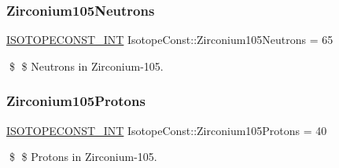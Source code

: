 \subsubsection{\texorpdfstring{Zirconium105\+Neutrons}{Zirconium105Neutrons}}
{\footnotesize\ttfamily \mbox{\hyperlink{group___isotope_const-_macros_ga5f18360b3e99483a35c32d789e62621c}{I\+S\+O\+T\+O\+P\+E\+C\+O\+N\+S\+T\+\_\+\+I\+NT}} Isotope\+Const\+::\+Zirconium105\+Neutrons = 65}

\$ \$ Neutrons in Zirconium-\/105. \mbox{\label{group___isotope_const-_zirconium-_zr105_gae532e434485d6dff9c8f589cf54dce54}} 
\subsubsection{\texorpdfstring{Zirconium105\+Protons}{Zirconium105Protons}}
{\footnotesize\ttfamily \mbox{\hyperlink{group___isotope_const-_macros_ga5f18360b3e99483a35c32d789e62621c}{I\+S\+O\+T\+O\+P\+E\+C\+O\+N\+S\+T\+\_\+\+I\+NT}} Isotope\+Const\+::\+Zirconium105\+Protons = 40}

\$ \$ Protons in Zirconium-\/105. 